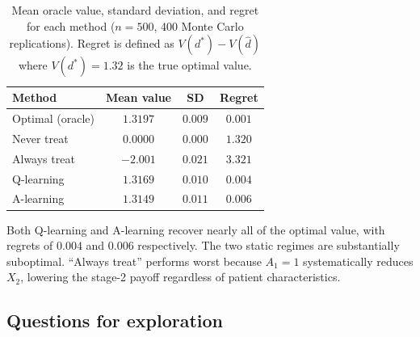 \documentclass[master.tex]{subfiles}
\begin{document}
\begin{table}[h]
\centering
\caption{Mean oracle value, standard deviation, and regret for each
method ($n = 500$, 400 Monte Carlo replications). Regret is defined as
$V(d^*) - V(\hat d)$ where $V(d^*)=1.32$ is the true optimal value.}
\label{w15:tab:sim}
\begin{tabular}{lccc}
\toprule
Method & Mean value & SD & Regret \\
\midrule
Optimal (oracle)   & $1.3197$ & $0.009$ & $0.001$ \\
Never treat        & $0.0000$ & $0.000$ & $1.320$ \\
Always treat       & $-2.001$ & $0.021$ & $3.321$ \\
Q-learning         & $1.3169$ & $0.010$ & $0.004$ \\
A-learning         & $1.3149$ & $0.011$ & $0.006$ \\
\bottomrule
\end{tabular}
\end{table}

Both Q-learning and A-learning recover nearly all of the optimal value,
with regrets of $0.004$ and $0.006$ respectively.
The two static regimes are substantially suboptimal.
``Always treat'' performs worst because $A_1 = 1$ systematically
reduces $X_2$, lowering the stage-2 payoff regardless of patient
characteristics.

\subsection{Questions for exploration}
\label{w15:sec:lab:questions}
\end{document}
